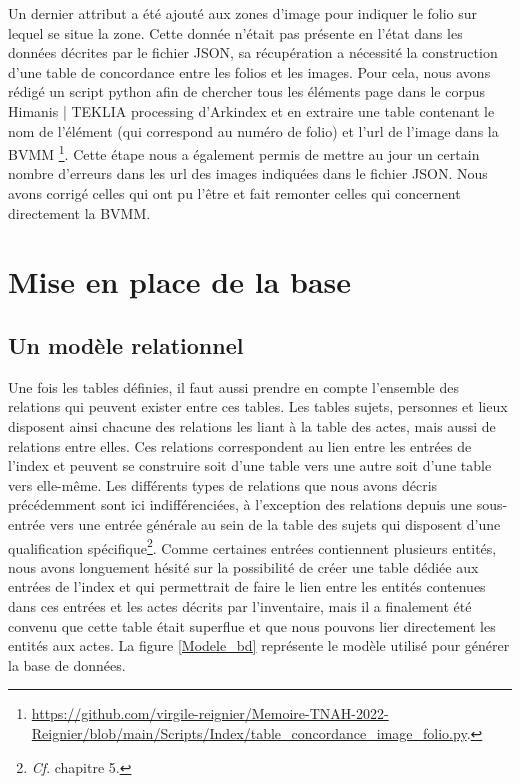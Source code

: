 \documentclass[a4paper,12pt,twoside]{book}
\begin{document}
	Un dernier attribut a été ajouté aux zones d'image pour indiquer le folio sur lequel se situe la zone. Cette donnée n'était pas présente en l'état dans les données décrites par le fichier JSON, sa récupération a nécessité la construction d'une table de concordance entre les folios et les images. Pour cela, nous avons rédigé un script python afin de chercher tous les éléments \og page\fg{} dans le corpus \og Himanis | TEKLIA processing\fg{} d'Arkindex et en extraire une table contenant le nom de l'élément (qui correspond au numéro de folio) et l'url de l'image dans la BVMM \footnote{\url{https://github.com/virgile-reignier/Memoire-TNAH-2022-Reignier/blob/main/Scripts/Index/table_concordance_image_folio.py}.}. Cette étape nous a également permis de mettre au jour un certain nombre d'erreurs dans les url des images indiquées dans le fichier JSON. Nous avons corrigé celles qui ont pu l'être et fait remonter celles qui concernent directement la BVMM.
	
	\section{Mise en place de la base}
	
	\subsection{Un modèle relationnel}

	Une fois les tables définies, il faut aussi prendre en compte l'ensemble des relations qui peuvent exister entre ces tables. Les tables sujets, personnes et lieux disposent ainsi chacune des relations les liant à la table des actes, mais aussi de relations entre elles. Ces relations correspondent au lien entre les entrées de l'index et peuvent se construire soit d'une table vers une autre soit d'une table vers elle-même. Les différents types de relations que nous avons décris précédemment sont ici indifférenciées, à l'exception des relations depuis une sous-entrée vers une entrée générale au sein de la table des sujets qui disposent d'une qualification spécifique\footnote{\textit{Cf}. chapitre 5.}. Comme certaines entrées contiennent plusieurs entités, nous avons longuement hésité sur la possibilité de créer une table dédiée aux entrées de l'index et qui permettrait de faire le lien entre les entités contenues dans ces entrées et les actes décrits par l'inventaire, mais il a finalement été convenu que cette table était superflue et que nous pouvons lier directement les entités aux actes. La figure \ref{Modele_bd} représente le modèle utilisé pour générer la base de données.
	
\end{document}
